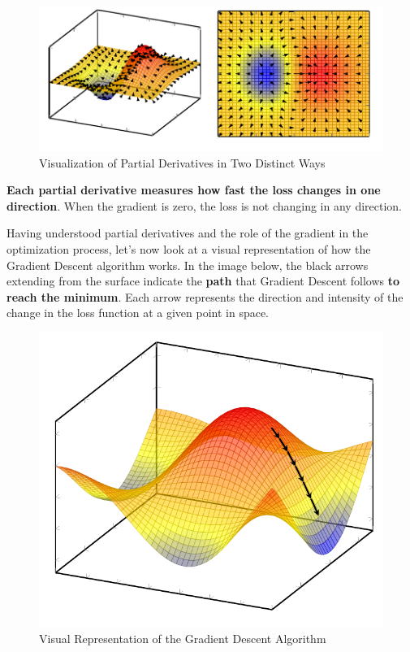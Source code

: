 \begin{figure}[!htbp]
    \centering
    \includegraphics[scale=2]{tikz/chapter2 - Partial Derivatives.pdf}
    \caption{Visualization of Partial Derivatives in Two Distinct Ways}
\end{figure}

\textbf{Each partial derivative measures how fast the loss changes in one direction}. When the gradient is zero, the loss is not changing in any direction.

Having understood partial derivatives and the role of the gradient in the optimization process, let's now look at a visual representation of how the Gradient Descent algorithm works. In the image below, the black arrows extending from the surface indicate the \textbf{path} that Gradient Descent follows \textbf{to reach the minimum}. Each arrow represents the direction and intensity of the change in the loss function at a given point in space.

\begin{figure}[!htbp]
    \centering
    \includegraphics[scale=0.75]{tikz/chapter2 - Gradient Descent.pdf}
    \caption{Visual Representation of the Gradient Descent Algorithm}
\end{figure}

